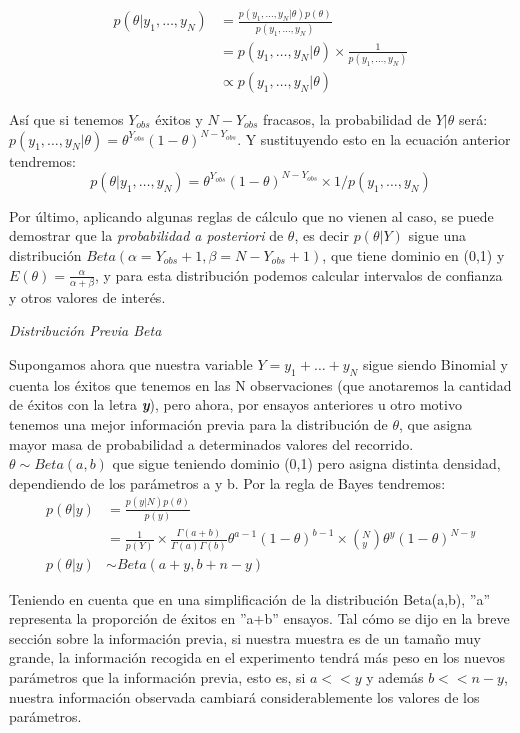 \documentclass[12pt]{article}
\begin{document}
\[
\begin{split}
p(\theta|y_1,\ldots,y_N) & =\frac{p(y_1,\ldots,y_N|\theta)p(\theta)}{p(y_1,\ldots,y_N)} \\
& = p(y_1,\ldots,y_N|\theta)\times\frac{1}{p(y_1,\ldots,y_N)}\\
& \propto p(y_1,\ldots,y_N|\theta)
\end{split}
\]

Así que si tenemos $Y_{obs}$ éxitos y $N-Y_{obs}$ fracasos, la probabilidad de $Y|\theta$ será: $p(y_1,\ldots,y_N|\theta)=\theta^{Y_{obs}}(1-\theta)^{N-Y_{obs}}$. Y sustituyendo esto en la ecuación anterior tendremos:\\

\[
p(\theta|y_1,\ldots,y_N) = \theta^{Y_{obs}}(1-\theta)^{N-Y_{obs}}\times 1 / p(y_1,\ldots,y_N)
\]

Por último, aplicando algunas reglas de cálculo que no vienen al caso, se puede demostrar que la \textit{probabilidad a posteriori} de $\theta$, es decir $p(\theta|Y)$ sigue una distribución $Beta(\alpha=Y_{obs}+1,\beta=N-Y_{obs}+1)$, que tiene dominio en (0,1) y $E(\theta)=\frac{\alpha}{\alpha+\beta}$, y para esta distribución podemos calcular intervalos de confianza y otros valores de interés.

\begin{center}
	\textit{Distribución Previa Beta}
\end{center}

Supongamos ahora que nuestra variable $Y=y_1 + \ldots + y_N$ sigue siendo Binomial y cuenta los éxitos que tenemos en las N observaciones (que anotaremos la cantidad de éxitos con la letra \textbf{\textit{y}}), pero ahora, por ensayos anteriores u otro motivo tenemos una mejor información previa para la distribución de $\theta$, que asigna mayor masa de probabilidad a determinados valores del recorrido. $\theta \sim Beta(a,b)$ que sigue teniendo dominio (0,1) pero asigna distinta densidad, dependiendo de los parámetros a y b. Por la regla de Bayes tendremos:\\

\[
\begin{split}
p(\theta|y) & = \frac{p(y|N)p(\theta)}{p(y)}\\
& = \frac{1}{p(Y)}\times \frac{\Gamma(a+b)}{\Gamma(a)\Gamma(b)}\theta^{a-1}(1-\theta)^{b-1}\times (^N_{y})\theta^y(1-\theta)^{N-y}\\
p(\theta|y) & \sim Beta(a+y,b+n-y)
\end{split}
\]

Teniendo en cuenta que en una simplificación de la distribución Beta(a,b), ''a'' representa la proporción de éxitos en ''a+b'' ensayos. Tal cómo se dijo en la breve sección sobre la información previa, si nuestra muestra es de un tamaño muy grande, la información recogida en el experimento tendrá más peso en los nuevos parámetros que la información previa, esto es, si $a<<y$ y además $b<<n-y$, nuestra información observada cambiará considerablemente los valores de los parámetros.
\end{document}
